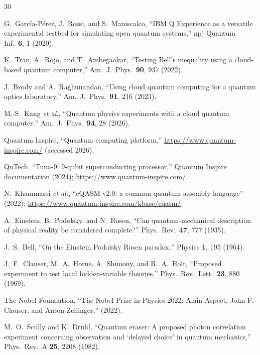 \documentclass[amsmath,amssymb,reprint,aps,prb]{revtex4-2}
\begin{document}
\begin{thebibliography}{30}

G.~Garc\'{i}a-P\'{e}rez, J.~Rossi, and S.~Maniscalco,
``IBM Q Experience as a versatile experimental testbed for
simulating open quantum systems,''
npj Quantum Inf.\ \textbf{6}, 1 (2020).

K.~Tran, A.~Rojo, and T.~Ambegaokar,
``Testing Bell's inequality using a cloud-based quantum computer,''
Am.\ J.\ Phys.\ \textbf{90}, 937 (2022).

J.~Brody and A.~Raghunandan,
``Using cloud quantum computing for a quantum optics laboratory,''
Am.\ J.\ Phys.\ \textbf{91}, 216 (2023).

M.-S.~Kang \textit{et al.},
``Quantum physics experiments with a cloud quantum computer,''
Am.\ J.\ Phys.\ \textbf{94}, 28 (2026).

Quantum Inspire,
``Quantum computing platform,''
\url{https://www.quantum-inspire.com/} (accessed 2026).

QuTech,
``Tuna-9: 9-qubit superconducting processor,''
Quantum Inspire documentation (2024);
\url{https://www.quantum-inspire.com/}.

N.~Khammassi \textit{et al.},
``cQASM v2.0: a common quantum assembly language'' (2022);
\url{https://www.quantum-inspire.com/kbase/cqasm/}.

A.~Einstein, B.~Podolsky, and N.~Rosen,
``Can quantum-mechanical description of physical reality be
considered complete?''
Phys.\ Rev.\ \textbf{47}, 777 (1935).

J.~S.~Bell,
``On the Einstein Podolsky Rosen paradox,''
Physics \textbf{1}, 195 (1964).

J.~F.~Clauser, M.~A.~Horne, A.~Shimony, and R.~A.~Holt,
``Proposed experiment to test local hidden-variable theories,''
Phys.\ Rev.\ Lett.\ \textbf{23}, 880 (1969).

The Nobel Foundation,
``The Nobel Prize in Physics 2022: Alain Aspect, John F. Clauser,
and Anton Zeilinger,'' (2022).

M.~O.~Scully and K.~Dr\"{u}hl,
``Quantum eraser: A proposed photon correlation experiment concerning
observation and `delayed choice' in quantum mechanics,''
Phys.\ Rev.\ A \textbf{25}, 2208 (1982).


\end{thebibliography}
\end{document}
